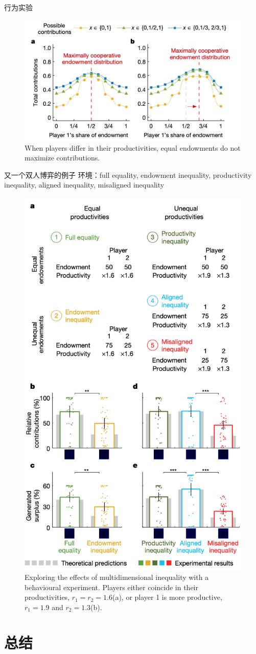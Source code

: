 \documentclass{beamer}
\begin{document}
\begin{frame}{行为实验}
    \begin{figure}
        \centering
        \includegraphics[width = 0.8\linewidth]{figs/Fig3.png}
        \caption{When players differ in their productivities, equal endowments do not maximize contributions. }
    \end{figure}
\end{frame}
\begin{frame}{又一个双人博弈的例子}
    环境：full equality, endowment inequality, productivity inequality, aligned inequality, misaligned inequality 
    \begin{figure}
        \centering
        \includegraphics[width = 0.3\linewidth]{figs/Fig4.png}
        \caption{Exploring the effects of multidimensional inequality with a behavioural experiment. Players either coincide in their productivities, $r_1 =r_2 =1.6$(a), or player 1 is more productive, $r_1 =1.9$ and $r_2 =1.3$(b).}
    \end{figure}
\end{frame}

\section{总结}
\end{document}
